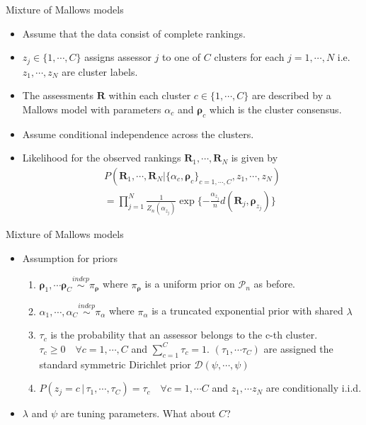 \documentclass[11pt]{beamer}
\begin{document}
\begin{frame}{Mixture of Mallows models}
\begin{itemize}
    \item Assume that the data consist of complete rankings.
    \item $z_j\in \{1,\cdots, C\}$ assigns assessor $j$ to one of $C$ clusters for each $j=1,\cdots, N$ \; i.e. $z_1, \cdots, z_N$ are cluster labels.
    \item The assessments $\mathbf{R}$ within each cluster $c\in\{1,\cdots, C\}$ are described by a Mallows model with parameters $\alpha_c$ and $\boldsymbol{\rho}_c$ which is the cluster consensus. 
    \item Assume conditional independence across the clusters.
    \item Likelihood for the observed rankings $\mathbf{R}_1, \cdots, \mathbf{R}_N$ is given by 
    \begin{multline*}
        P(\mathbf{R}_1, \cdots, \mathbf{R}_N|\{\alpha_c, \boldsymbol{\rho}_c\}_{c=1,\cdots, C}, z_1, \cdots, z_N)\\ = \prod_{j=1}^N \frac{1}{Z_n(\alpha_{z_j})}\exp\{-\frac{\alpha_{z_j}}{n} d(\mathbf{R}_j, \boldsymbol{\rho}_{z_j})\}
    \end{multline*}
\end{itemize}
\end{frame}

\begin{frame}{Mixture of Mallows models}
\begin{itemize}
    \item Assumption for priors
    \begin{enumerate}
        \item $\boldsymbol{\rho}_1, \cdots \boldsymbol{\rho}_C \overset{indep}{\sim} \pi_{\boldsymbol{\rho}}$ where $\pi_{\boldsymbol{\rho}}$ is a uniform prior on $\mathcal{P}_n$ as before.
        \item $\alpha_1, \cdots, \alpha_C \overset{indep}{\sim} \pi_\alpha$ where $\pi_\alpha$ is a truncated exponential prior with shared $\lambda$
        \item $\tau_c$ is the probability that an assessor belongs to the c-th cluster. \\ $\tau_c\geq 0 \quad \forall c=1,\cdots, C$ and $\sum_{c=1}^C \tau_c=1$. \; $(\tau_1, \cdots \tau_C)$ are assigned the standard symmetric Dirichlet prior $\mathcal{D}(\psi, \cdots, \psi)$
        \item $P(z_j=c \,|\, \tau_1, \cdots, \tau_C)=\tau_c \quad \forall c=1,\cdots C$ and $z_1, \cdots z_N$ are conditionally i.i.d.
    \end{enumerate}
    \item $\lambda$ and $\psi$ are tuning parameters. What about $C$?
\end{itemize}
\end{frame}
\end{document}
